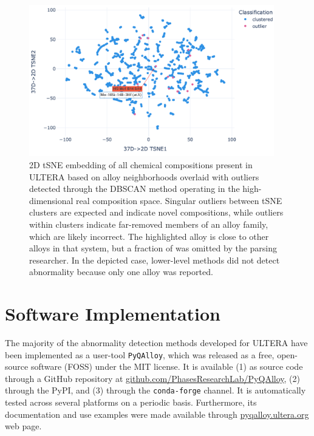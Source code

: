 \begin{figure}[H]
    \centering
    \includegraphics[width=0.95\textwidth]{pyqalloy/PyQAlloy_tSNE+DBSCAN.png}
    \caption{2D tSNE embedding of all chemical compositions present in ULTERA based on alloy neighborhoods overlaid with outliers detected through the DBSCAN method operating in the high-dimensional real composition space. Singular outliers between tSNE clusters are expected and indicate novel compositions, while outliers within clusters indicate far-removed members of an alloy family, which are likely incorrect. The highlighted  alloy is close to other alloys in that system, but a fraction of  was omitted by the parsing researcher. In the depicted case, lower-level methods did not detect abnormality because only one alloy was reported.}
    \label{pyqalloy:fig:patternglobal}
\end{figure}

\section{Software Implementation} \label{pyqalloy:sec:software}

The majority of the abnormality detection methods developed for ULTERA have been implemented as a user-tool \texttt{PyQAlloy}, which was released as a free, open-source software (FOSS) under the MIT license. It is available (1) as source code through a GitHub repository at \href{https://github.com/PhasesResearchLab/PyQAlloy}{github.com/PhasesResearchLab/PyQAlloy}, (2) through the PyPI, and (3) through the \texttt{conda-forge} channel. It is automatically tested across several platforms on a periodic basis. Furthermore, its documentation and use examples were made available through \href{https://pyqalloy.ultera.org/}{pyqalloy.ultera.org} web page.




